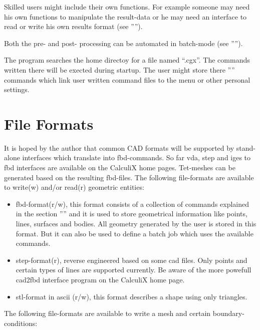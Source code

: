 \documentclass{article}
\begin{document}
Skilled users might include their own functions. For example someone may need his own functions to manipulate the result-data or he may need an interface to read or write his own results format (see '''').

Both the pre- and post- processing can be automated in batch-mode (see '''').

The program searches the home directoy for a file named ``.cgx''. The commands written there will be exected during startup. The user might store there '''' commands which link user written command files to the menu or other personal settings. 

\section{\label{File Formats}File Formats}
It is hoped by the author that common CAD formats will be supported by stand-alone interfaces which translate into fbd-commands. So far vda, step and iges to fbd interfaces are available on the CalculiX home pages. Tet-meshes can be generated based on the resulting fbd-files. The following file-formats are available to write(w) and/or read(r) geometric entities:
\begin{itemize}
\item fbd-format(r/w), this format consists of a collection of commands explained in the section '''' and it is used to store geometrical information like points, lines, surfaces and bodies. All geometry generated by the user is stored in this format. But it can also be used to define a batch job which uses the available commands.
\item step-format(r), reverse engineered based on some cad files. Only points and certain types of lines are supported currently. Be aware of the more powefull cad2fbd interface program on the CalculiX home page.
\item stl-format in ascii (r/w), this format describes a shape using only triangles.
\end{itemize}
The following file-formats are available to write a mesh and certain boundary-conditions:
\end{document}
